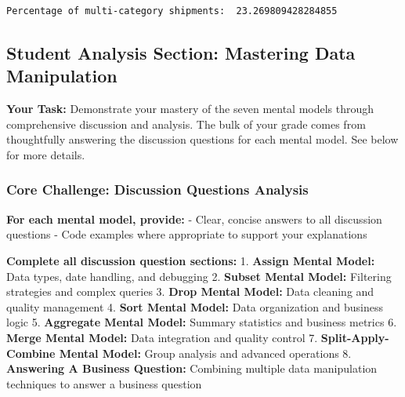 \documentclass[
]{article}
\begin{document}
\begin{verbatim}
Percentage of multi-category shipments:  23.269809428284855
\end{verbatim}

\subsection{Student Analysis Section: Mastering Data
Manipulation}\label{student-analysis-section}

\textbf{Your Task:} Demonstrate your mastery of the seven mental models
through comprehensive discussion and analysis. The bulk of your grade
comes from thoughtfully answering the discussion questions for each
mental model. See below for more details.

\subsubsection{Core Challenge: Discussion Questions
Analysis}\label{core-challenge-discussion-questions-analysis}

\textbf{For each mental model, provide:} - Clear, concise answers to all
discussion questions - Code examples where appropriate to support your
explanations

\begin{tcolorbox}[enhanced jigsaw, colbacktitle=quarto-callout-important-color!10!white, toptitle=1mm, colframe=quarto-callout-important-color-frame, bottomtitle=1mm, colback=white, left=2mm, breakable, coltitle=black, bottomrule=.15mm, rightrule=.15mm, titlerule=0mm, opacityback=0, title=\textcolor{quarto-callout-important-color}{\faExclamation}\hspace{0.5em}{📊 Discussion Questions Requirements}, arc=.35mm, opacitybacktitle=0.6, toprule=.15mm, leftrule=.75mm]

\textbf{Complete all discussion question sections:} 1. \textbf{Assign
Mental Model:} Data types, date handling, and debugging 2.
\textbf{Subset Mental Model:} Filtering strategies and complex queries
3. \textbf{Drop Mental Model:} Data cleaning and quality management 4.
\textbf{Sort Mental Model:} Data organization and business logic 5.
\textbf{Aggregate Mental Model:} Summary statistics and business metrics
6. \textbf{Merge Mental Model:} Data integration and quality control 7.
\textbf{Split-Apply-Combine Mental Model:} Group analysis and advanced
operations 8. \textbf{Answering A Business Question:} Combining multiple
data manipulation techniques to answer a business question

\end{tcolorbox}
\end{document}
